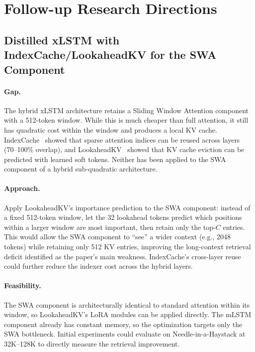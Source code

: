 \documentclass[11pt]{article}
\begin{document}
\section{Follow-up Research Directions}

\subsection{Distilled xLSTM with IndexCache/LookaheadKV for the SWA Component}

\paragraph{Gap.}
The hybrid xLSTM architecture retains a Sliding Window Attention component with a 512-token window.
While this is much cheaper than full attention, it still has quadratic cost within the window and produces a local KV cache.
IndexCache~\cite{indexcache} showed that sparse attention indices can be reused across layers (70--100\% overlap), and LookaheadKV~\cite{lookaheadkv} showed that KV cache eviction can be predicted with learned soft tokens.
Neither has been applied to the SWA component of a hybrid sub-quadratic architecture.

\paragraph{Approach.}
Apply LookaheadKV's importance prediction to the SWA component: instead of a fixed 512-token window, let the 32 lookahead tokens predict which positions within a larger window are most important, then retain only the top-$C$ entries.
This would allow the SWA component to ``see'' a wider context (e.g., 2048 tokens) while retaining only 512 KV entries, improving the long-context retrieval deficit identified as the paper's main weakness.
IndexCache's cross-layer reuse could further reduce the indexer cost across the hybrid layers.

\paragraph{Feasibility.}
The SWA component is architecturally identical to standard attention within its window, so LookaheadKV's LoRA modules can be applied directly.
The mLSTM component already has constant memory, so the optimization targets only the SWA bottleneck.
Initial experiments could evaluate on Needle-in-a-Haystack at 32K--128K to directly measure the retrieval improvement.
\end{document}
